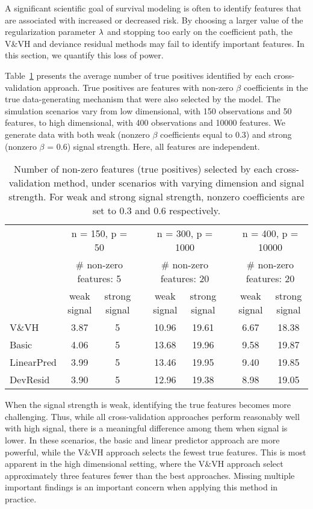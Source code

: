A significant scientific goal of survival modeling is often to identify features that are associated with increased or decreased risk. By choosing a larger value of the regularization parameter $\lambda$ and stopping too early on the coefficient path, the V\&VH and deviance residual methods may fail to identify important features. In this section, we quantify this loss of power.

Table~\ref{Tab:power} presents the average number of true positives identified by each cross-validation approach. True positives are features with non-zero $\beta$ coefficients in the true data-generating mechanism that were also selected by the model. The simulation scenarios vary from low dimensional, with 150 observations and 50 features, to high dimensional, with 400 observations and 10000 features. We generate data with both weak (nonzero $\beta$ coefficients equal to 0.3) and strong (nonzero $\beta$ = 0.6) signal strength. Here, all features are independent.

\begin{table}[!htb]
\setlength{\tabcolsep}{3pt}
\caption{\label{Tab:power} Number of non-zero features (true positives) selected by each cross-validation method, under scenarios with varying dimension and signal strength. For weak and strong signal strength, nonzero coefficients are set to 0.3 and 0.6 respectively.}
\centering
\begin{tabular}[t]{l cc c cc c cc}
\toprule
&\multicolumn{2}{c}{n = 150, p = 50} & & \multicolumn{2}{c}{n = 300, p = 1000} & & \multicolumn{2}{c}{n = 400, p = 10000} \\
&\multicolumn{2}{c}{$\#$ non-zero features: 5} & & \multicolumn{2}{c}{$\#$ non-zero features: 20} & & \multicolumn{2}{c}{$\#$ non-zero features: 20} \\
\cline{2-3} \cline{5-6} \cline{8-9}
& weak signal & strong signal & & weak signal & strong signal && weak signal & strong signal\\
V\&VH        & 3.87 & 5& & 10.96 & 19.61 & & 6.67 & 18.38\\
Basic          & 4.06 & 5& & 13.68 & 19.96 & & 9.58 & 19.87\\
LinearPred  & 3.99 & 5& & 13.46 & 19.95 & & 9.40 & 19.85\\
DevResid    & 3.90 & 5& & 12.96 & 19.38 & & 8.98 & 19.05\\
\bottomrule
\end{tabular}
\end{table}

When the signal strength is weak, identifying the true features becomes more challenging. Thus, while all cross-validation approaches perform reasonably well with high signal, there is a meaningful difference among them when signal is lower. In these scenarios, the basic and linear predictor approach are more powerful, while the V\&VH approach selects the fewest true features. This is most apparent in the high dimensional setting, where the V\&VH approach select approximately three features fewer than the best approaches. Missing multiple important findings is an important concern when applying this method in practice.

